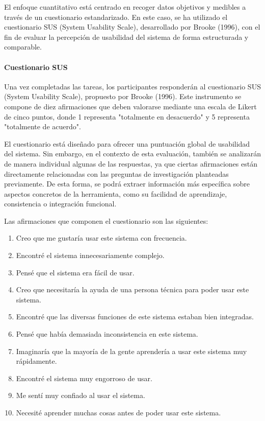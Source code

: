 El enfoque cuantitativo está centrado en recoger datos objetivos y medibles a través de un cuestionario estandarizado. En este caso, se ha utilizado el cuestionario SUS (System Usability Scale), desarrollado por Brooke (1996), con el fin de evaluar la percepción de usabilidad del sistema de forma estructurada y comparable.

\paragraph{Cuestionario SUS}
Una vez completadas las tareas, los participantes responderán al cuestionario SUS (System Usability Scale), propuesto por Brooke (1996). Este instrumento se compone de diez afirmaciones que deben valorarse mediante una escala de Likert de cinco puntos, donde 1 representa "totalmente en desacuerdo" y 5 representa "totalmente de acuerdo".

El cuestionario está diseñado para ofrecer una puntuación global de usabilidad del sistema. Sin embargo, en el contexto de esta evaluación, también se analizarán de manera individual algunas de las respuestas, ya que ciertas afirmaciones están directamente relacionadas con las preguntas de investigación planteadas previamente. De esta forma, se podrá extraer información más específica sobre aspectos concretos de la herramienta, como su facilidad de aprendizaje, consistencia o integración funcional.

Las afirmaciones que componen el cuestionario son las siguientes:

\begin{enumerate}
    \item Creo que me gustaría usar este sistema con frecuencia.
    \item Encontré el sistema innecesariamente complejo.
    \item Pensé que el sistema era fácil de usar.
    \item Creo que necesitaría la ayuda de una persona técnica para poder usar este sistema.
    \item Encontré que las diversas funciones de este sistema estaban bien integradas.
    \item Pensé que había demasiada inconsistencia en este sistema.
    \item Imaginaría que la mayoría de la gente aprendería a usar este sistema muy rápidamente.
    \item Encontré el sistema muy engorroso de usar.
    \item Me sentí muy confiado al usar el sistema.
    \item Necesité aprender muchas cosas antes de poder usar este sistema.
\end{enumerate}

